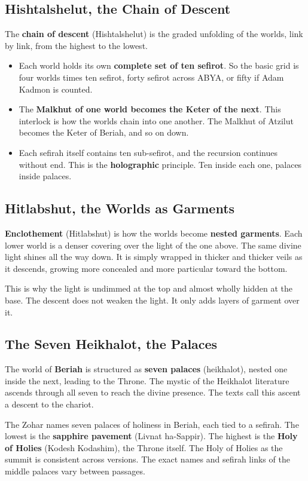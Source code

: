\subsection{Hishtalshelut, the Chain of Descent}

The \textbf{chain of descent} (Hishtalshelut) is the graded unfolding of the worlds, link by link,
from the highest to the lowest.

\begin{itemize}
 \item Each world holds its own \textbf{complete set of ten sefirot}. So the basic grid is four worlds
 times ten sefirot, forty sefirot across ABYA, or fifty if Adam Kadmon is counted.
 \item The \textbf{Malkhut of one world becomes the Keter of the next}. This interlock is how the
 worlds chain into one another. The Malkhut of Atzilut becomes the Keter of Beriah, and so on down.
 \item Each sefirah itself contains ten sub-sefirot, and the recursion continues without end. This is
 the \textbf{holographic} principle. Ten inside each one, palaces inside palaces.
\end{itemize}

\subsection{Hitlabshut, the Worlds as Garments}

\textbf{Enclothement} (Hitlabshut) is how the worlds become \textbf{nested garments}. Each lower world is a
denser covering over the light of the one above. The same divine light shines all the way down. It is
simply wrapped in thicker and thicker veils as it descends, growing more concealed and more particular
toward the bottom.

This is why the light is undimmed at the top and almost wholly hidden at the base. The descent does not
weaken the light. It only adds layers of garment over it.

\subsection{The Seven Heikhalot, the Palaces}

The world of \textbf{Beriah} is structured as \textbf{seven palaces} (heikhalot), nested one inside the
next, leading to the Throne. The mystic of the Heikhalot literature ascends through all seven to reach
the divine presence. The texts call this ascent a descent to the chariot.

The Zohar names seven palaces of holiness in Beriah, each tied to a sefirah. The lowest is the
\textbf{sapphire pavement} (Livnat ha-Sappir). The highest is the \textbf{Holy of Holies} (Kodesh
Kodashim), the Throne itself. The Holy of Holies as the summit is consistent across versions. The exact
names and sefirah links of the middle palaces vary between passages.
